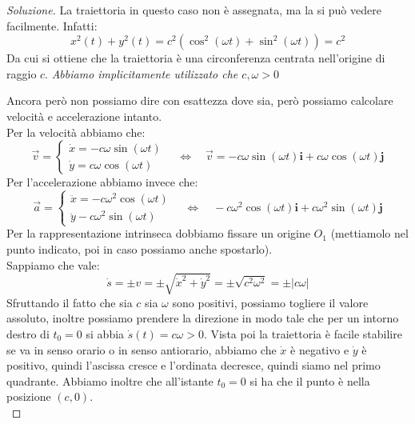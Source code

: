 \documentclass[11pt,a4paper,twoside]{article}
\theoremstyle{definition}
\newenvironment{sol}
	{\renewcommand\qedsymbol{$\blacksquare$}\begin{proof}[Soluzione]}
	{\end{proof}}
\begin{document}
\begin{sol}
	La traiettoria in questo caso non è assegnata, ma la si può vedere facilmente. Infatti:
	\[ x^2(t) + y^2(t) = c^2 (\cos^2(\omega t) + \sin^2(\omega t)) = c^2\]
	Da cui si ottiene che la traiettoria è una circonferenza centrata nell'origine di raggio $c$.
	\textit{Abbiamo implicitamente utilizzato che $c,\omega>0$}
	\begin{center}
	\end{center}
	Ancora però non possiamo dire con esattezza dove sia, però possiamo calcolare velocità e accelerazione intanto.\\
	Per la velocità abbiamo che:
	\[ \vec v = \begin{cases}\dot x = -c \omega \sin(\omega t)\\ \dot y = c \omega \cos(\omega t)\end{cases} \quad \Leftrightarrow \quad \vec v = -c \omega \sin(\omega t) \mathbf i + c \omega \cos(\omega t) \mathbf j \]
	Per l'accelerazione abbiamo invece che:
	\[ \vec a = \begin{cases} \ddot x = -c\omega^2 \cos(\omega t)\\ \ddot y -c\omega^2\sin(\omega t) \end{cases} \quad \Leftrightarrow \quad -c\omega^2 \cos(\omega t)\mathbf i + c \omega^2 \sin(\omega t)\mathbf j\]
	Per la rappresentazione intrinseca dobbiamo fissare un origine $O_1$ (mettiamolo nel punto indicato, poi in caso possiamo anche  spostarlo).\\
	Sappiamo che vale:
	\[ \dot s = \pm v = \pm \sqrt{\dot x^2 + \dot y^2} = \pm \sqrt{c^2 \omega^2} = \pm |c \omega| \]
	Sfruttando il fatto che sia $c$ sia $\omega$ sono positivi, possiamo togliere il valore assoluto, inoltre possiamo prendere la direzione in modo tale che per un intorno destro di $t_0 = 0$ si abbia $\dot s(t) = c \omega >0$. Vista poi la traiettoria è facile stabilire se va in senso orario o in senso antiorario, abbiamo che $\dot x$ è negativo e $\dot y$ è positivo, quindi l'ascissa cresce e l'ordinata decresce, quindi siamo nel primo quadrante. Abbiamo inoltre che all'istante $t_0 = 0$ si ha che il punto è nella posizione $(c,0)$.\\

\end{sol}
\end{document}
